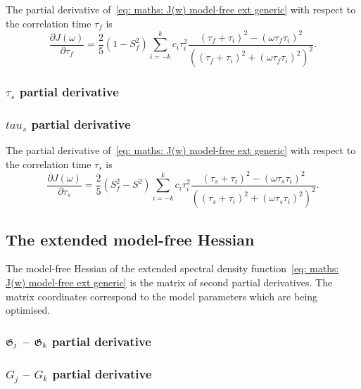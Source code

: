 The partial derivative of~\eqref{eq: maths: J(w) model-free ext generic} with respect to the correlation time $\tau_f$ is
\begin{equation}
    \frac{\partial J(\omega)}{\partial \tau_f} = \frac{2}{5} (1 - S^2_f) \sum_{i=-k}^k c_i \tau_i^2
        \frac{(\tau_f + \tau_i)^2 - (\omega \tau_f \tau_i)^2}{\left((\tau_f + \tau_i)^2 + (\omega \tau_f \tau_i)^2 \right)^2}.
\end{equation}



\begin{latexonly}
    \subsubsection{$\tau_s$ partial derivative}
\end{latexonly}
\begin{htmlonly}
    \subsubsection{$tau_s$ partial derivative}
\end{htmlonly}

The partial derivative of~\eqref{eq: maths: J(w) model-free ext generic} with respect to the correlation time $\tau_s$ is
\begin{equation}
    \frac{\partial J(\omega)}{\partial \tau_s} = \frac{2}{5} (S^2_f - S^2) \sum_{i=-k}^k c_i \tau_i^2
        \frac{(\tau_s + \tau_i)^2 - (\omega \tau_s \tau_i)^2}{\left((\tau_s + \tau_i)^2 + (\omega \tau_s \tau_i)^2 \right)^2}.
\end{equation}





\newpage
\subsection{The extended model-free Hessian}

The model-free Hessian of the extended spectral density function~\eqref{eq: maths: J(w) model-free ext generic} is the matrix of second partial derivatives.  The matrix coordinates correspond to the model parameters which are being optimised.



\begin{latexonly}
    \subsubsection{$\mathfrak{G}_j$ -- $\mathfrak{G}_k$ partial derivative}
\end{latexonly}
\begin{htmlonly}
    \subsubsection{$G_j$ -- $G_k$ partial derivative}
\end{htmlonly}

